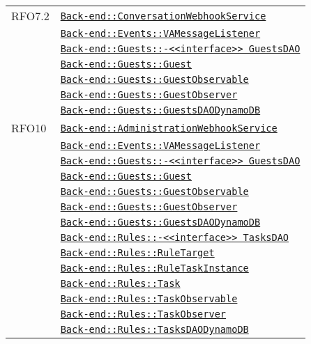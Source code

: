 \begin{longtable}{|>{\centering}m{3cm}|m{10cm}<{\centering}|}
RFO7.2 & \hyperref[Back-end::ConversationWebhookService]{\texttt{Back-end::ConversationWebhookService}}\\
& \hyperref[Back-end::Events::VAMessageListener]{\texttt{Back-end::Events::VAMessageListener}}\\
& \hyperref[Back-end::Guests::<<interface>> GuestsDAO]{\texttt{Back-end::Guests::-\linebreak <<interface>> GuestsDAO}}\\
& \hyperref[Back-end::Guests::Guest]{\texttt{Back-end::Guests::Guest}}\\
& \hyperref[Back-end::Guests::GuestObservable]{\texttt{Back-end::Guests::GuestObservable}}\\
& \hyperref[Back-end::Guests::GuestObserver]{\texttt{Back-end::Guests::GuestObserver}}\\
& \hyperref[Back-end::Guests::GuestsDAODynamoDB]{\texttt{Back-end::Guests::GuestsDAODynamoDB}}\\ \hline

RFO10 & \hyperref[Back-end::AdministrationWebhookService]{\texttt{Back-end::AdministrationWebhookService}}\\
& \hyperref[Back-end::Events::VAMessageListener]{\texttt{Back-end::Events::VAMessageListener}}\\
& \hyperref[Back-end::Guests::<<interface>> GuestsDAO]{\texttt{Back-end::Guests::-\linebreak <<interface>> GuestsDAO}}\\
& \hyperref[Back-end::Guests::Guest]{\texttt{Back-end::Guests::Guest}}\\
& \hyperref[Back-end::Guests::GuestObservable]{\texttt{Back-end::Guests::GuestObservable}}\\
& \hyperref[Back-end::Guests::GuestObserver]{\texttt{Back-end::Guests::GuestObserver}}\\
& \hyperref[Back-end::Guests::GuestsDAODynamoDB]{\texttt{Back-end::Guests::GuestsDAODynamoDB}}\\
& \hyperref[Back-end::Rules::<<interface>> TasksDAO]{\texttt{Back-end::Rules::-\linebreak <<interface>> TasksDAO}}\\
& \hyperref[Back-end::Rules::RuleTarget]{\texttt{Back-end::Rules::RuleTarget}}\\
& \hyperref[Back-end::Rules::RuleTaskInstance]{\texttt{Back-end::Rules::RuleTaskInstance}}\\
& \hyperref[Back-end::Rules::Task]{\texttt{Back-end::Rules::Task}}\\
& \hyperref[Back-end::Rules::TaskObservable]{\texttt{Back-end::Rules::TaskObservable}}\\
& \hyperref[Back-end::Rules::TaskObserver]{\texttt{Back-end::Rules::TaskObserver}}\\
& \hyperref[Back-end::Rules::TasksDAODynamoDB]{\texttt{Back-end::Rules::TasksDAODynamoDB}}\\ \hline


\end{longtable}
